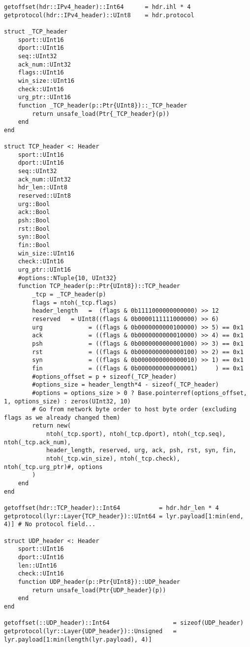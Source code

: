 \begin{lstlisting}[language=JuliaLocal, style=julia]
getoffset(hdr::IPv4_header)::Int64      = hdr.ihl * 4
getprotocol(hdr::IPv4_header)::UInt8    = hdr.protocol

struct _TCP_header
    sport::UInt16
    dport::UInt16
    seq::UInt32
    ack_num::UInt32
    flags::UInt16
    win_size::UInt16
    check::UInt16
    urg_ptr::UInt16
    function _TCP_header(p::Ptr{UInt8})::_TCP_header
        return unsafe_load(Ptr{_TCP_header}(p))
    end
end

struct TCP_header <: Header
    sport::UInt16
    dport::UInt16
    seq::UInt32
    ack_num::UInt32
    hdr_len::UInt8
    reserved::UInt8
    urg::Bool
    ack::Bool
    psh::Bool
    rst::Bool
    syn::Bool
    fin::Bool
    win_size::UInt16
    check::UInt16
    urg_ptr::UInt16
    #options::NTuple{10, UInt32}
    function TCP_header(p::Ptr{UInt8})::TCP_header
        _tcp = _TCP_header(p)
        flags = ntoh(_tcp.flags)
        header_length   =  (flags & 0b1111000000000000) >> 12
        reserved   = UInt8((flags & 0b0000111111000000) >> 6)
        urg             = ((flags & 0b0000000000100000) >> 5) == 0x1
        ack             = ((flags & 0b0000000000010000) >> 4) == 0x1
        psh             = ((flags & 0b0000000000001000) >> 3) == 0x1
        rst             = ((flags & 0b0000000000000100) >> 2) == 0x1
        syn             = ((flags & 0b0000000000000010) >> 1) == 0x1
        fin             = ((flags & 0b0000000000000001)     ) == 0x1
        #options_offset = p + sizeof(_TCP_header)
        #options_size = header_length*4 - sizeof(_TCP_header)
        #options = options_size > 0 ? Base.pointerref(options_offset, 1, options_size) : zeros(UInt32, 10)
        # Go from network byte order to host byte order (excluding flags as we already changed them)
        return new(
            ntoh(_tcp.sport), ntoh(_tcp.dport), ntoh(_tcp.seq), ntoh(_tcp.ack_num),
            header_length, reserved, urg, ack, psh, rst, syn, fin, 
            ntoh(_tcp.win_size), ntoh(_tcp.check), ntoh(_tcp.urg_ptr)#, options
        )
    end
end

getoffset(hdr::TCP_header)::Int64           = hdr.hdr_len * 4
getprotocol(lyr::Layer{TCP_header})::UInt64 = lyr.payload[1:min(end, 4)] # No protocol field...

struct UDP_header <: Header
    sport::UInt16
    dport::UInt16
    len::UInt16
    check::UInt16
    function UDP_header(p::Ptr{UInt8})::UDP_header
        return unsafe_load(Ptr{UDP_header}(p))
    end
end

getoffset(::UDP_header)::Int64                  = sizeof(UDP_header)
getprotocol(lyr::Layer{UDP_header})::Unsigned   = lyr.payload[1:min(length(lyr.payload), 4)]


\end{lstlisting}

